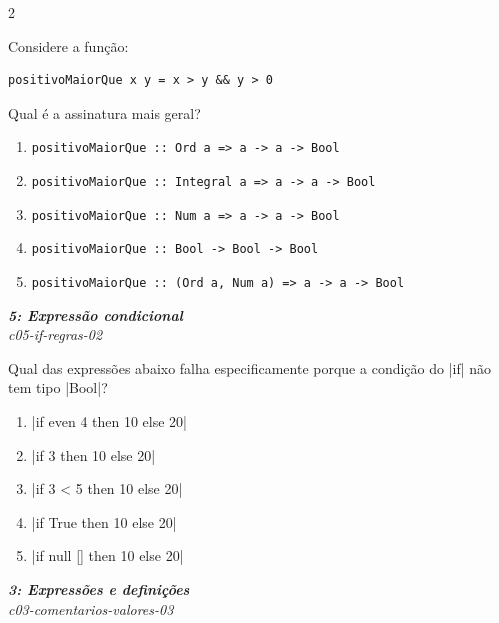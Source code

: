\documentclass[a4paper,10pt,brazil]{article}
\begin{document}
\begin{multicols}{2}
\begin{flushright}
\end{flushright}
Considere a função:

\begin{verbatim}
positivoMaiorQue x y = x > y && y > 0
\end{verbatim}

Qual é a assinatura mais geral?

\begin{enumerate}
  \item \texttt{positivoMaiorQue :: Ord a => a -> a -> Bool}
  \item \texttt{positivoMaiorQue :: Integral a => a -> a -> Bool}
  \item \texttt{positivoMaiorQue :: Num a => a -> a -> Bool}
  \item \texttt{positivoMaiorQue :: Bool -> Bool -> Bool}
  \item \texttt{positivoMaiorQue :: (Ord a, Num a) => a -> a -> Bool}

\end{enumerate}

\begin{flushright}
  \footnotesize
  \textit{\textbf{5: Expressão condicional}}\\
  \textit{c05-if-regras-02}\\

\end{flushright}
Qual das expressões abaixo falha especificamente porque a condição do \haskellinline|if| não tem tipo \haskellinline|Bool|?

\begin{enumerate}
  \item \haskellinline|if even 4 then 10 else 20|

  \item \haskellinline|if 3 then 10 else 20|

  \item \haskellinline|if 3 < 5 then 10 else 20|

  \item \haskellinline|if True then 10 else 20|

  \item \haskellinline|if null [] then 10 else 20|


\end{enumerate}

\begin{flushright}
  \footnotesize
  \textit{\textbf{3: Expressões e definições}}\\
  \textit{c03-comentarios-valores-03}\\


\end{flushright}
\end{multicols}
\end{document}
